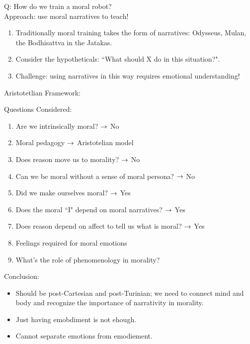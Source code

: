 Q: How do we train a moral robot? \\

Approach: use moral narratives to teach!
\begin{enumerate}
	\item Traditionally moral training takes the form of narratives: Odysseus, Mulan, the Bodhisattva in the Jatakas.
	\item Consider the hypotheticals: ``What should X do in this situation?".
	\item Challenge: using narratives in this way requires emotional understanding!
\end{enumerate}


Aristotetlian Framework:


Questions Considered:
\begin{enumerate}
	\item Are we intrinsically moral?
	$\rightarrow$ No
	\item Moral pedagogy $\rightarrow$ Aristotelian model
	\item Does reason move us to morality?
	$\rightarrow$ No
	\item Can we be moral without a sense of moral persona?
	$\rightarrow$ No
	\item Did we make ourselves moral?
	$\rightarrow$ Yes
	\item Does the moral ``I" depend on moral narratives?
	$\rightarrow$ Yes
	\item Does reason depend on affect to tell us what is moral?
	$\rightarrow$ Yes
	\item Feelings required for moral emotions
	\item What's the role of phenomenology in morality?
\end{enumerate}


Conclusion:
\begin{itemize}
	\item Should be post-Cartesian and post-Turinian; we need to connect mind and body and recognize the importance of narrativity in morality.
	\item Just having emobdiment is not ehough.
	\item Cannot separate emotions from emodiement.
	\end{itemize}


\spacerule

